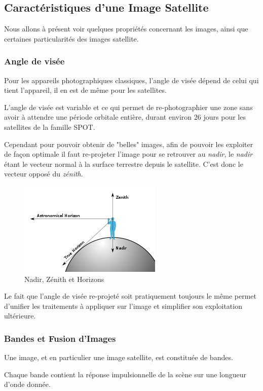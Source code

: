 \documentclass[a4paper, 11pt]{report}
\begin{document}
\subsection{Caractéristiques d'une Image Satellite}
Nous allons à présent voir quelques propriétés concernant les images, ainsi que certaines particularités des images satellite.
\subsubsection{Angle de visée}
Pour les appareils photographiques classiques, l'angle de visée dépend de celui qui tient l'appareil, il en est de même pour les satellites. 

L'angle de visée est variable et ce qui permet de re-photographier une zone sans avoir à attendre une période orbitale entière, durant environ $26$ jours pour les satellites de la famille SPOT.

Cependant pour pouvoir obtenir de "belles" images, afin de pouvoir les exploiter de façon optimale il faut re-projeter l'image pour se retrouver au \emph{nadir}, le \emph{nadir} étant le vecteur normal à la surface terrestre depuis le satellite. C'est donc le vecteur opposé du \emph{zénith}.
\begin{figure}[H]
	\begin{center}
		\includegraphics[scale=0.5]{Images/Nadir.png}
		\caption{Nadir, Zénith et Horizons}
	\end{center}
\end{figure}

Le fait que l'angle de visée re-projeté soit pratiquement toujours le même permet d'unifier les traitements à appliquer sur l'image et simplifier son exploitation ultérieure.
\subsubsection{Bandes et Fusion d'Images}
Une image, et en particulier une image satellite, est constituée de bandes. 

Chaque bande contient la réponse impulsionnelle de la scène sur une longueur d'onde donnée.
\end{document}
